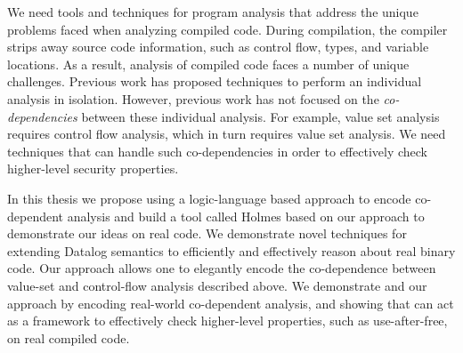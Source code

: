 We need tools and techniques for program analysis that address the unique problems faced when analyzing compiled code.
During compilation, the compiler strips away source code information, such as control flow, types, and variable locations.
As a result, analysis of compiled code faces a number of unique challenges.
Previous work has proposed techniques to perform an individual analysis in isolation.
However, previous work has not focused on the \emph{co-dependencies} between these individual analysis.
For example, value set analysis requires control flow analysis, which in turn requires value set
analysis.
We need techniques that can handle such co-dependencies in order to effectively check higher-level security properties.

In this thesis we propose using a logic-language based approach to encode co-dependent analysis and build a tool called Holmes based on our approach to demonstrate our ideas on real code.
We demonstrate novel techniques for extending Datalog semantics to efficiently and effectively reason about real binary code.
Our approach allows one to elegantly encode the co-dependence between value-set and control-flow analysis described above.
We demonstrate {\sysname} and our approach by encoding real-world co-dependent analysis, and showing that {\sysname} can act as a framework to effectively check higher-level properties, such as use-after-free, on real compiled code.
